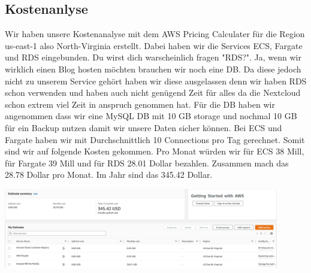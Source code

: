 \documentclass{article}
\begin{document}
\subsection{Kostenanlyse}
Wir haben unsere Kostenanalyse mit dem AWS Pricing Calculater für die Region us-east-1 also North-Virginia erstellt. Dabei haben wir die Services ECS, Fargate und RDS eingebunden. Du wirst dich warscheinlich fragen "RDS?". Ja, wenn wir wirklich einen Blog hosten möchten brauchen wir noch eine DB. Da diese jedoch nicht zu unserem Service gehört haben wir diese ausgelassen denn wir haben RDS schon verwenden und haben auch nicht genügend Zeit für alles da die Nextcloud schon extrem viel Zeit in anspruch genommen hat. Für die DB haben wir angenommen dass wir eine MySQL DB mit 10 GB storage und nochmal 10 GB für ein Backup nutzen damit wir unsere Daten sicher können. Bei ECS und Fargate haben wir mit Durchschnittlich 10 Connections pro Tag gerechnet.
\newline
\newline
Somit sind wir auf folgende Kosten gekommen. Pro Monat würden wir für ECS 38 Mill, für Fargate 39 Mill und für RDS 28.01 Dollar bezahlen. Zusammen mach das 28.78 Dollar pro Monat. Im Jahr sind das 345.42 Dollar.

\begin{center}
    \includegraphics[width=12cm]{images/wordpress_11.jpg}
\end{center}
\end{document}
